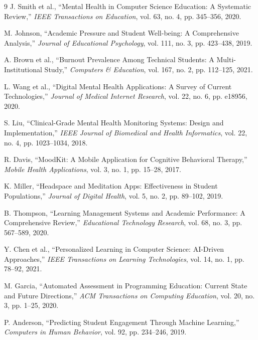 \documentclass[conference,10pt]{IEEEtran}
\begin{document}
\begin{thebibliography}{9}
J. Smith et al., ``Mental Health in Computer Science Education: A Systematic Review,'' \emph{IEEE Transactions on Education}, vol. 63, no. 4, pp. 345--356, 2020.

M. Johnson, ``Academic Pressure and Student Well-being: A Comprehensive Analysis,'' \emph{Journal of Educational Psychology}, vol. 111, no. 3, pp. 423--438, 2019.

A. Brown et al., ``Burnout Prevalence Among Technical Students: A Multi-Institutional Study,'' \emph{Computers \& Education}, vol. 167, no. 2, pp. 112--125, 2021.

L. Wang et al., ``Digital Mental Health Applications: A Survey of Current Technologies,'' \emph{Journal of Medical Internet Research}, vol. 22, no. 6, pp. e18956, 2020.

S. Liu, ``Clinical-Grade Mental Health Monitoring Systems: Design and Implementation,'' \emph{IEEE Journal of Biomedical and Health Informatics}, vol. 22, no. 4, pp. 1023--1034, 2018.

R. Davis, ``MoodKit: A Mobile Application for Cognitive Behavioral Therapy,'' \emph{Mobile Health Applications}, vol. 3, no. 1, pp. 15--28, 2017.

K. Miller, ``Headspace and Meditation Apps: Effectiveness in Student Populations,'' \emph{Journal of Digital Health}, vol. 5, no. 2, pp. 89--102, 2019.

B. Thompson, ``Learning Management Systems and Academic Performance: A Comprehensive Review,'' \emph{Educational Technology Research}, vol. 68, no. 3, pp. 567--589, 2020.

Y. Chen et al., ``Personalized Learning in Computer Science: AI-Driven Approaches,'' \emph{IEEE Transactions on Learning Technologies}, vol. 14, no. 1, pp. 78--92, 2021.

M. Garcia, ``Automated Assessment in Programming Education: Current State and Future Directions,'' \emph{ACM Transactions on Computing Education}, vol. 20, no. 3, pp. 1--25, 2020.

P. Anderson, ``Predicting Student Engagement Through Machine Learning,'' \emph{Computers in Human Behavior}, vol. 92, pp. 234--246, 2019.
\end{thebibliography}
\end{document}
